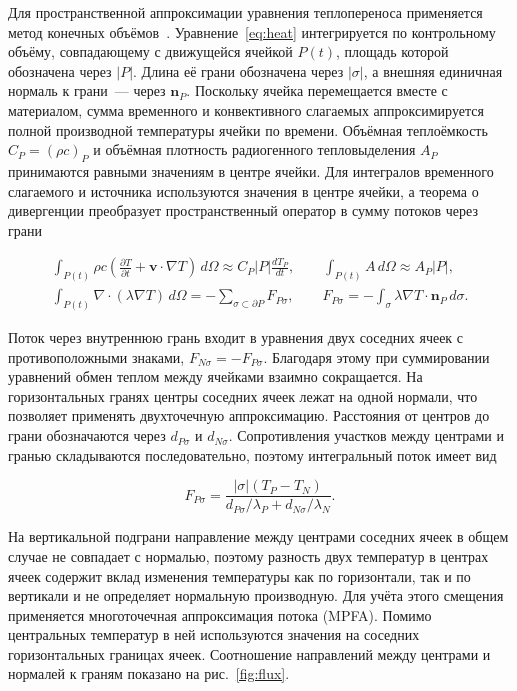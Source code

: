 Для пространственной аппроксимации уравнения теплопереноса применяется метод конечных объёмов~\cite{samarskii2003}. Уравнение~\eqref{eq:heat} интегрируется по контрольному объёму, совпадающему с движущейся ячейкой $P(t)$, площадь которой обозначена через $|P|$. Длина её грани обозначена через $|\sigma|$, а внешняя единичная нормаль к грани~--- через $\boldsymbol n_P$. Поскольку ячейка перемещается вместе с материалом, сумма временного и конвективного слагаемых аппроксимируется полной производной температуры ячейки по времени. Объёмная теплоёмкость $C_P=(\rho c)_P$ и объёмная плотность радиогенного тепловыделения $A_P$ принимаются равными значениям в центре ячейки. Для интегралов временного слагаемого и источника используются значения в центре ячейки, а теорема о дивергенции преобразует пространственный оператор в сумму потоков через грани

\begin{gather}
 \int_{P(t)} \rho c\left(\frac{\partial T}{\partial t}
              + \boldsymbol v \cdot \nabla T\right)\,d\Omega
      \approx C_P|P|\frac{dT_P}{dt},\qquad
 \int_{P(t)} A\,d\Omega \approx A_P|P|,\\
 \int_{P(t)} \nabla \cdot (\lambda\nabla T)\,d\Omega
       = -\sum_{\sigma\subset\partial P} F_{P\sigma},\qquad
 F_{P\sigma} = -\int_\sigma \lambda\nabla T \cdot \boldsymbol n_P\,d\sigma.
\end{gather}

Поток через внутреннюю грань входит в уравнения двух соседних ячеек с противоположными знаками, $F_{N\sigma}=-F_{P\sigma}$. Благодаря этому при суммировании уравнений обмен теплом между ячейками взаимно сокращается. На горизонтальных гранях центры соседних ячеек лежат на одной нормали, что позволяет применять двухточечную аппроксимацию. Расстояния от центров до грани обозначаются через $d_{P\sigma}$ и $d_{N\sigma}$. Сопротивления участков между центрами и гранью складываются последовательно, поэтому интегральный поток имеет вид

\begin{equation}
 F_{P\sigma} = \frac{|\sigma|(T_P - T_N)}
                    {d_{P\sigma}/\lambda_P + d_{N\sigma}/\lambda_N}.
\end{equation}

На вертикальной подграни направление между центрами соседних ячеек в общем случае не совпадает с нормалью, поэтому разность двух температур в центрах ячеек содержит вклад изменения температуры как по горизонтали, так и по вертикали и не определяет нормальную производную. Для учёта этого смещения применяется многоточечная аппроксимация потока (MPFA). Помимо центральных температур в ней используются значения на соседних горизонтальных границах ячеек. Соотношение направлений между центрами и нормалей к граням показано на рис.~\ref{fig:flux}.


